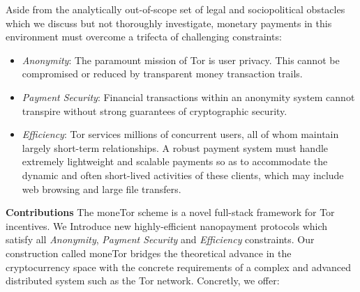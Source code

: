Aside from the analytically out-of-scope set of legal and sociopolitical
obstacles which we discuss but not thoroughly investigate, monetary payments in
this environment must overcome a trifecta of challenging constraints:

\begin{itemize}
\item \emph{Anonymity}: The paramount mission of Tor is user privacy. This
  cannot be compromised or reduced by transparent money transaction trails.
\item \emph{Payment Security}: Financial transactions within an anonymity system
  cannot transpire without strong guarantees of cryptographic security.
\item \emph{Efficiency}: Tor services millions of concurrent users, all of whom
  maintain largely short-term relationships. A robust payment system must handle
  extremely lightweight and scalable payments so as to accommodate the dynamic
  and often short-lived activities of these clients, which may include web
  browsing and large file transfers.
\end{itemize}


\label{sec:Contributions}
\textbf{Contributions} The moneTor scheme is a novel full-stack framework for
Tor incentives. We Introduce new highly-efficient nanopayment protocols which
satisfy all \emph{Anonymity}, \emph{Payment Security} and \emph{Efficiency}
constraints. Our construction called moneTor bridges the theoretical advance in
the cryptocurrency space with the concrete requirements of a complex and
advanced distributed system such as the Tor network. Concretly, we offer:
 
